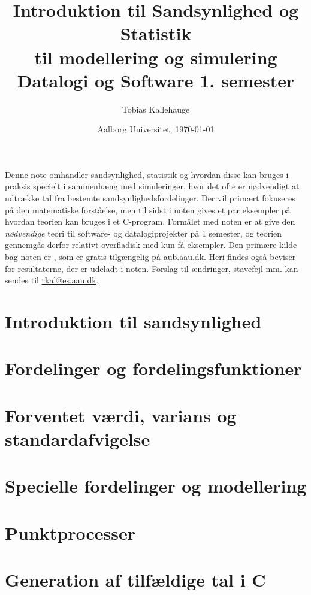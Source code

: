 \documentclass{article}
\title{Introduktion til Sandsynlighed og Statistik \\
til modellering og simulering  \\
\large Datalogi og Software 1. semester}
\date{Aalborg Universitet, \today}
\author{Tobias Kallehauge}
\begin{document}
\maketitle
\newpage
Denne note omhandler sandsynlighed, statistik og hvordan disse kan bruges i praksis specielt i sammenhæng med simuleringer, hvor det ofte er nødvendigt at udtrække tal fra bestemte sandsynlighedsfordelinger. Der vil primært fokuseres på den matematiske forståelse, men til sidst i noten gives et par eksempler på hvordan teorien kan bruges i et C-program. Formålet med noten er at give den \emph{nødvendige} teori til software- og datalogiprojekter på  1 semester, og teorien gennemgås derfor relativt overfladisk med kun få eksempler. Den primære kilde bag noten er \cite{olofsson2012}, som er gratis tilgængelig på \href{aub.aau.dk}{aub.aau.dk}. Heri findes også beviser for resultaterne, der er udeladt i noten. Forslag til ændringer, stavefejl mm. kan sendes til \href{mailto:tkal@es.aau.dk}{tkal@es.aau.dk}. 
\section{Introduktion til sandsynlighed}


\section{Fordelinger og fordelingsfunktioner}


\section{Forventet værdi, varians og standardafvigelse}


\section{Specielle fordelinger og modellering} 


\section{Punktprocesser}


\section{Generation af tilfældige tal i C}

\printbibliography[heading=bibintoc]
\label{bib:mybiblio}
\end{document}
